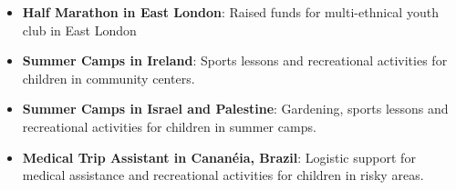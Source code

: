 \documentclass[margin,a4paper]{res}
\def\tightlist{}
\begin{document}
{\begin{itemize}
{  \section{Volunteering}\label{volunteering}}
  \tightlist
\item
  \textbf{Half Marathon in East London}: Raised funds for multi-ethnical
  youth club in East London
\item
  \textbf{Summer Camps in Ireland}: Sports lessons and recreational
  activities for children in community centers.
\item
  \textbf{Summer Camps in Israel and Palestine}: Gardening, sports
  lessons and recreational activities for children in summer camps.
\item
  \textbf{Medical Trip Assistant in Cananéia, Brazil}: Logistic support
  for medical assistance and recreational activities for children in
  risky areas.
\end{itemize}}
\end{document}
